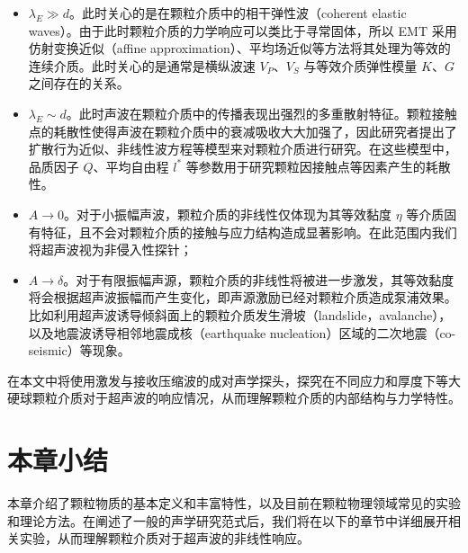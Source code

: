 \begin{itemize}
  \item $\lambda_{E}\gg d$。此时关心的是在颗粒介质中的相干弹性波（coherent elastic waves）。由于此时颗粒介质的力学响应可以类比于寻常固体，所以 EMT 采用仿射变换近似（affine approximation）、平均场近似等方法将其处理为等效的连续介质。此时关心的是通常是横纵波速 $V_{P}$、$V_{S}$ 与等效介质弹性模量 $K$、$G$ 之间存在的关系。
  \item $\lambda_{E}\sim d$。此时声波在颗粒介质中的传播表现出强烈的多重散射特征。颗粒接触点的耗散性使得声波在颗粒介质中的衰减吸收大大加强了，因此研究者提出了扩散行为近似\cite{PhysRevLett.93.154303}、非线性波方程\cite{Transitional,hamilton_nonlinear_1998}等模型来对颗粒介质进行研究。在这些模型中，品质因子 $Q$、平均自由程 $l^{*}$ 等参数用于研究颗粒因接触点等因素产生的耗散性。
  \item $A\rightarrow 0$。对于小振幅声波，颗粒介质的非线性仅体现为其等效黏度 $\eta$ 等介质固有特征，且不会对颗粒介质的接触与应力结构造成显著影响。在此范围内我们将超声波视为非侵入性探针；
  \item $A\rightarrow \delta$。对于有限振幅声源，颗粒介质的非线性将被进一步激发，其等效黏度将会根据超声波振幅而产生变化，即声源激励已经对颗粒介质造成泵浦效果。比如利用超声波诱导倾斜面上的颗粒介质发生滑坡（landslide，avalanche）\cite{PhysRevE.102.042901}，以及地震波诱导相邻地震成核（earthquake nucleation）区域的二次地震（co-seismic）\cite{Johnson_2005}等现象。
\end{itemize}

在本文中将使用激发与接收压缩波的成对声学探头，探究在不同应力和厚度下等大硬球颗粒介质对于超声波的响应情况，从而理解颗粒介质的内部结构与力学特性。

\section{本章小结}

本章介绍了颗粒物质的基本定义和丰富特性，以及目前在颗粒物理领域常见的实验和理论方法。在阐述了一般的声学研究范式后，我们将在以下的章节中详细展开相关实验，从而理解颗粒介质对于超声波的非线性响应。